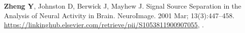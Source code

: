 \documentclass[9pt,lineno]{elife}
\begin{document}
\begin{thebibliography}{31}
\textbf{\color{eLifeMediumGrey} Zheng Y}, Johnston D, Berwick J, Mayhew J.
\newblock Signal {Source} {Separation} in the {Analysis} of {Neural} {Activity}
  in {Brain}.
\newblock NeuroImage.  2001 Mar; 13(3):447--458.
\newblock
  \urlprefix\url{https://linkinghub.elsevier.com/retrieve/pii/S1053811900907055},
  \href{10.1006/nimg.2000.0705}{\doiprefix
  }.

\end{thebibliography}
\end{document}
